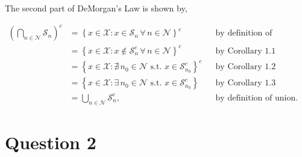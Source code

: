 \documentclass[12 pt,letterpaper]{article}
\newcommand{\calN}{\mathcal{N}}
\newcommand{\calS}{\mathcal{S}}
\newcommand{\rmc}{\mathrm{c}}
\begin{document}
The second part of DeMorgan's Law is shown by,

\begin{align*}
    \left(\bigcap_{n\in\mathcal{N}} \mathcal{S}_n\right)^c
    &= \left\{x \in \mathcal{X} : x \in \mathcal{S}_{n} 
        \,\forall\, n \in \mathcal{N}\right\}^c && \text{by definition of intersection} \\
    &= \left\{x \in \mathcal{X} : x \notin \mathcal{S}_{n}^{c} 
        \,\forall\, n \in \mathcal{N}\right\}^c && \text{by Corollary 1.1} \\
    &= \left\{x \in \mathcal{X} : \nexists\, n_0 \in \mathcal{N}
        \text{ s.t. } x \in \mathcal{S}_{n_0}^{c}\right\}^c && \text{by Corollary 1.2} \\
    &= \left\{x \in \mathcal{X} : \exists\, n_0 \in \mathcal{N}
        \text{ s.t. } x \in \mathcal{S}_{n_0}^{c}\right\} && \text{by Corollary 1.3} \\
    &= \bigcup_{n\in\calN}\calS_n^\rmc, && \text{by definition of union}.
\end{align*}

\clearpage
\section*{Question 2}
\end{document}

